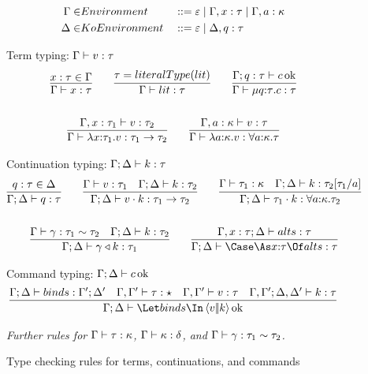 \documentclass{article}
\begin{document}
\begin{figure}[h]
\centering
\begin{align*}
  \Gamma \in& Environment
  &
  &::= \varepsilon
  \mid \Gamma, x : \tau
  \mid \Gamma, a : \kappa
  \\
  \Delta \in& KoEnvironment
  &
  &::= \varepsilon
  \mid \Delta, q : \tau
\end{align*}

Term typing: $\Gamma \vdash v : \tau$
\begin{gather*}
  \infer
  {\Gamma \vdash x : \ty}
  {
    x:\ty \in \Gamma
  }
  \qquad
  \infer
  {\Gamma \vdash \lit : \ty}
  {\ty = literalType(\lit)}
  \qquad
  \infer
  {\Gamma \vdash \compute{\ann q \ty} \com : \ty}
  {
    \Gamma; q:\ty \vdash \com \Ok
  }
  \\\\
  \infer
  {\Gamma \vdash \fn{\ann x {\ty_1}} \tm : \ty_1 \to \ty_2}
  {
    \Gamma, x : \ty_1 \vdash \tm : \ty_2
  }
  \qquad
  \infer
  {\Gamma \vdash \fn{\ann a \ki} \tm : \forall \ann a \ki. \ty}
  {
    \Gamma, a:\ki \vdash \tm : \ty
  }
\end{gather*}

Continuation typing: $\Gamma; \Delta \vdash k : \tau$
\begin{gather*}
  \infer
  {\Gamma;\Delta \vdash q : \ty}
  {
    q : \ty \in \Delta
  }
  \qquad
  \infer
  {\Gamma;\Delta \vdash \app{\tm}{\ko} : \ty_1 \to \ty_2}
  {
    \Gamma \vdash \tm : \ty_1
    &
    \Gamma;\Delta \vdash \ko : \ty_2
  }
  \qquad
  \infer
  {\Gamma;\Delta \vdash \app{\ty_1}{\ko} : \forall \ann a \ki. \ty_2}
  {
    \Gamma \vdash \ty_1 : \ki
    &
    \Gamma;\Delta \vdash \ko : \ty_2[\ty_1/a]
  }
  \\\\
  \infer
  {\Gamma;\Delta \vdash \koerce{\cn}{\ko} : \ty_1}
  {
    \Gamma \vdash \cn : \eqty{\ty_1}{\ty_2}
    &
    \Gamma;\Delta \vdash \ko : \ty_2
  }
  \qquad
  \infer
  {\Gamma;\Delta \vdash \caseas{\ann x \ty}{\alts} : \ty}
  {
    \Gamma, x:\ty;\Delta \vdash \alts : \ty
  }
\end{gather*}

Command typing: $\Gamma; \Delta \vdash c \operatorname{ok}$
\begin{gather*}
  \infer
  {\Gamma;\Delta \vdash \mcut{\tm}{\ko}{\binds} \Ok}
  {
    \Gamma;\Delta \vdash \binds : \Gamma';\Delta'
    &
    \Gamma,\Gamma' \vdash \ty : \star
    &
    \Gamma,\Gamma' \vdash \tm : \ty
    &
    \Gamma,\Gamma'; \Delta,\Delta' \vdash \ko : \ty
  }
\end{gather*}

\emph{Further rules for $\Gamma \vdash \tau : \kappa$,
  $\Gamma \vdash \kappa : \delta$, and
  $\Gamma \vdash \gamma : \tau_1 \sim \tau_2$.}
\caption{Type checking rules for terms, continuations, and commands}
\label{fig:typing-rules}
\end{figure}
\end{document}

